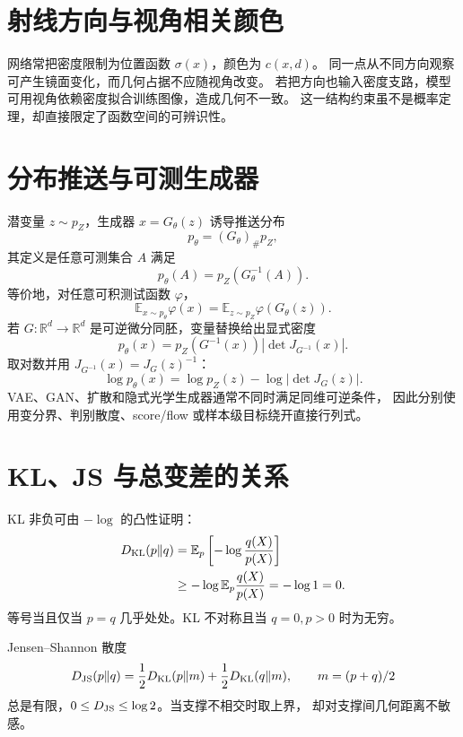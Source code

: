 \documentclass[11pt]{article}
\numberwithin{equation}{section}
\newcommand{\R}{\mathbb{R}}
\newcommand{\E}{\mathbb{E}}
\newcommand{\1}{\mathbf{1}}
\begin{document}
\section{射线方向与视角相关颜色}

网络常把密度限制为位置函数 $\sigma(x)$，颜色为 $c(x,d)$。
同一点从不同方向观察可产生镜面变化，而几何占据不应随视角改变。
若把方向也输入密度支路，模型可用视角依赖密度拟合训练图像，造成几何不一致。
这一结构约束虽不是概率定理，却直接限定了函数空间的可辨识性。

\section{分布推送与可测生成器}

潜变量 $z\sim p_Z$，生成器 $x=G_\theta(z)$ 诱导推送分布
\begin{equation}
 p_\theta=(G_\theta)_\#p_Z,
\end{equation}
其定义是任意可测集合 $A$ 满足
\begin{equation}
 p_\theta(A)=p_Z(G_\theta^{-1}(A)).
\end{equation}
等价地，对任意可积测试函数 $\varphi$，
\begin{equation}
 \E_{x\sim p_\theta}\varphi(x)
 =\E_{z\sim p_Z}\varphi(G_\theta(z)).
\end{equation}
若 $G:\R^d\to\R^d$ 是可逆微分同胚，变量替换给出显式密度
\begin{equation}
 p_\theta(x)=p_Z(G^{-1}(x))
 \left|\det J_{G^{-1}}(x)\right|.
\end{equation}
取对数并用 $J_{G^{-1}}(x)=J_G(z)^{-1}$：
\begin{equation}
 \log p_\theta(x)=\log p_Z(z)-\log|\det J_G(z)|.
\end{equation}
VAE、GAN、扩散和隐式光学生成器通常不同时满足同维可逆条件，
因此分别使用变分界、判别散度、score/flow 或样本级目标绕开直接行列式。

\section{KL、JS 与总变差的关系}

KL 非负可由 $-\log$ 的凸性证明：
\begin{align}
 D_{\rm KL}(p\|q)
 &=\E_p\left[-\log\frac{q(X)}{p(X)}\right]\\
 &\ge-\log\E_p\frac{q(X)}{p(X)}=-\log1=0.
\end{align}
等号当且仅当 $p=q$ 几乎处处。KL 不对称且当 $q=0,p>0$ 时为无穷。

Jensen--Shannon 散度
\begin{equation}
 D_{\rm JS}(p\|q)=\frac12D_{\rm KL}(p\|m)
 +\frac12D_{\rm KL}(q\|m),\qquad m=(p+q)/2
\end{equation}
总是有限，$0\le D_{\rm JS}\le\log2$。当支撑不相交时取上界，
却对支撑间几何距离不敏感。
\end{document}
